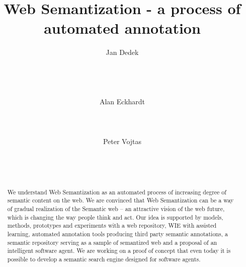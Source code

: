 \documentclass{sig-alternate}
\begin{document}


%
\title{Web Semantization - a process of automated annotation}



\author{
\alignauthor Jan Dedek\\
       \\
       \\
       \\
       \\
\alignauthor Alan Eckhardt\\
       \\
       \\
       \\
\alignauthor Peter Vojtas\\
       \\
       \\
       \\
}

\maketitle
\begin{abstract}
We understand Web Semantization as an automated process of increasing degree of semantic content on the web. %
We are convinced that Web Semantization can be a way of gradual realization of the Semantic web -- an attractive vision of the web future, which is changing the way people think and act.
Our idea is supported by models, methods, prototypes and experiments with a web repository, WIE with assisted learning, automated annotation tools producing third party semantic annotations, a semantic repository serving as a sample of semantized web and a proposal of an intelligent software agent. We are working on a proof of concept that even today it is possible to develop a semantic search engine designed for software agents.
\end{abstract}
\end{document}
